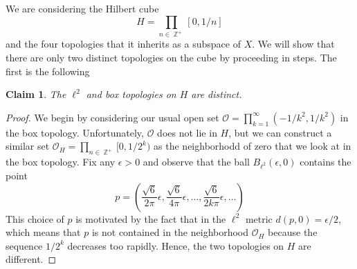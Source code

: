 \documentclass{article}
\DeclareMathOperator{\Z}{\mathbb{Z}}
\newcommand{\problempart}[1]{\noindent{\textbf{(#1)}}}
\newtheorem*{claim}{Claim}
\begin{document}
\problempart{c} We are considering the Hilbert cube 
\[
H = \prod_{n \in \Z^+} [0, 1/n]
\]
and the four topologies that it inherits as a subspace of $X$. We will show that there are only two distinct topologies on the cube by proceeding in steps. The first is the following \\
\begin{claim}
The $\ell^2$ and box topologies on $H$ are distinct. 
\end{claim}
\begin{proof}
We begin by considering our usual open set $\mathcal{O} = \prod_{k=1}^\infty (-1/k^2, 1/k^2)$ in the box topology. Unfortunately, $\mathcal{O}$ does not lie in $H$, but we can construct a similar set $\mathcal{O}_H = \prod_{n\in \Z^+} [0, 1/2^k)$ as the neighborhodd of zero that we look at in the box topology. Fix any $\epsilon > 0$ and observe that the ball $B_{\ell^2}(\epsilon,0)$ contains the point 
\[
p = (\frac{\sqrt{6}}{2\pi}\epsilon, \frac{\sqrt{6}}{4\pi}\epsilon, \ldots, \frac{\sqrt{6}}{2k\pi}\epsilon, \ldots)
\]
This choice of $p$ is motivated by the fact that in the $\ell^2$ metric $d(p,0) = \epsilon/2$, which means that $p$ is not contained in the neighborhood $\mathcal{O}_H$ because the sequence $1/2^k$ decreases too rapidly. Hence, the two topologies on $H$ are different. 
\end{proof}
\end{document}
